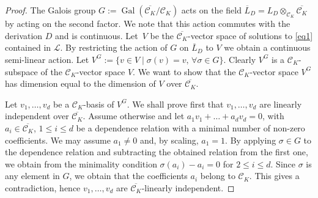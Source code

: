 \documentclass[10pt,a4paper]{amsart}
\numberwithin{equation}{section}
\def \Gal{\operatorname{Gal}}
\begin{document}
\begin{proof}
The Galois group $G:=\Gal(\overline{\mathcal{C}_K}/\mathcal{C}_K)$ acts on the field $\overline{L}_D=L_D\otimes_{\mathcal{C}_K} \overline{\mathcal{C}_K}$ by acting on the second factor. We note that this action commutes with the derivation $D$ and is continuous. Let~$V$ be the $\overline{\mathcal{C}_K}$-vector space of solutions to \eqref{eq1} contained in $\mathcal{L}$. By restricting the action of $G$ on $\overline{L}_D$ to $V$ we obtain a continuous semi-linear action. Let $V^G:=\{ v \in V \mid \sigma(v)=v, \, \forall \sigma \in G \}$. Clearly $V^G$ is a $\mathcal{C}_K$-subspace of the $\mathcal{C}_K$-vector space $V$. We want to show that the $\mathcal{C}_K$-vector space $V^G$ has dimension equal to the dimension of $V$ over $\overline{\mathcal{C}_K}$.

Let $v_1,\dots,v_d$ be a $\mathcal{C}_K$-basis of $V^G$. We shall prove first that $v_1,\dots,v_d$ are linearly independent over $\overline{\mathcal{C}_K}$. Assume otherwise and let $a_1v_1+\dots +a_dv_d=0$, with $a_i \in \overline{\mathcal{C}_K}$, $1 \leq i \leq d$ be a dependence relation with a minimal number of non-zero coefficients. We may assume $a_1 \neq 0$ and, by scaling, $a_1=1$. By applying $\sigma \in G$ to the dependence relation and subtracting the obtained relation from the first one, we obtain from the minimality condition $\sigma(a_i)-a_i=0$ for $2\leq i \leq d$. Since $\sigma$ is any element in $G$, we obtain that the coefficients $a_i$ belong to $\mathcal{C}_K$. This gives a contradiction, hence $v_1,\dots,v_d$ are $\overline{\mathcal{C}_K}$-linearly independent.


\end{proof}
\end{document}
